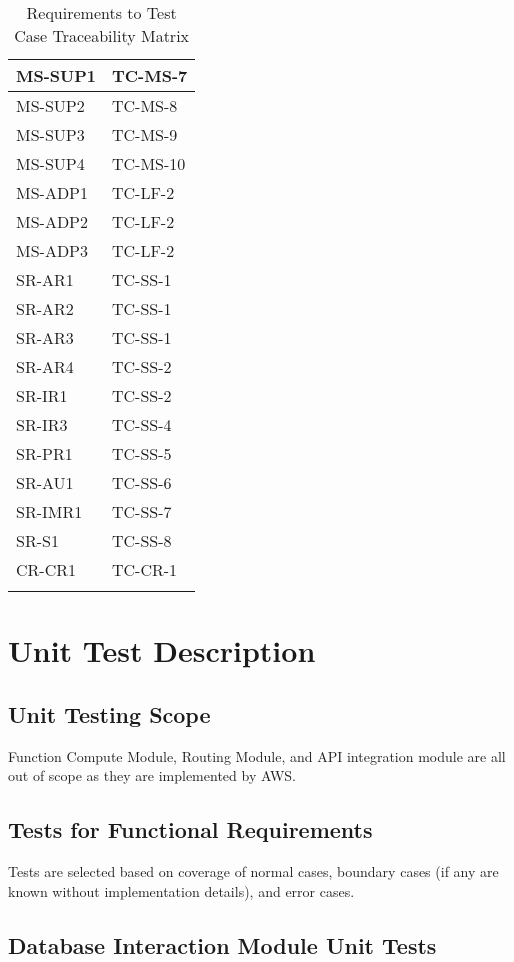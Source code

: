 \documentclass[12pt, titlepage]{article}
\begin{document}
\begin{longtable}{|l|l|}
  MS-SUP1 & TC-MS-7 \\ \hline
  MS-SUP2 & TC-MS-8 \\ \hline
  MS-SUP3 & TC-MS-9 \\ \hline
  MS-SUP4 & TC-MS-10 \\ \hline
  MS-ADP1 & TC-LF-2 \\ \hline
  MS-ADP2 & TC-LF-2 \\ \hline
  MS-ADP3 & TC-LF-2 \\ \hline
  SR-AR1 & TC-SS-1 \\ \hline
  SR-AR2 & TC-SS-1 \\ \hline
  SR-AR3 & TC-SS-1 \\ \hline
  SR-AR4 & TC-SS-2 \\ \hline
  SR-IR1 & TC-SS-2 \\ \hline
  SR-IR3 & TC-SS-4 \\ \hline
  SR-PR1 & TC-SS-5\\ \hline
  SR-AU1 & TC-SS-6 \\ \hline
  SR-IMR1 & TC-SS-7 \\ \hline
  SR-S1 & TC-SS-8 \\ \hline
  CR-CR1 & TC-CR-1 \\ \hline
  \caption{Requirements to Test Case Traceability Matrix}
\end{longtable}

\section{Unit Test Description}

\subsection{Unit Testing Scope}

Function Compute Module, Routing Module, and API integration module are all
out of scope as they are implemented by AWS.

\subsection{Tests for Functional Requirements}

Tests are selected based on coverage of normal cases, boundary cases
(if any are known without implementation details), and error cases.

\subsection{Database Interaction Module Unit Tests}
\end{document}
